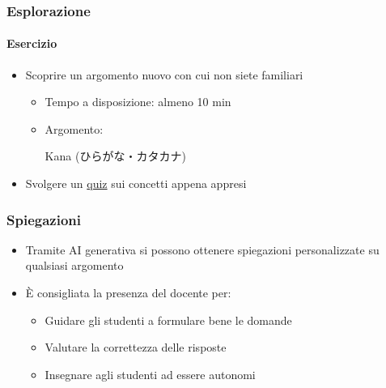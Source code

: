 \begin{exerciseframe}
    \frametitle{Esplorazione}
    \framesubtitle{Esercizio}

    \begin{itemize}
        \item Scoprire un argomento nuovo con cui non siete familiari
        \begin{itemize}
            \item Tempo a disposizione: almeno 10 min
            \item Argomento:\pause
                \begin{CJK}{UTF8}{min}
                    Kana (ひらがな・カタカナ)
                \end{CJK}
        \end{itemize}

        \pause
        \bigskip
        \item Svolgere un \href{https://play.blooket.com/host?id=67855de45130aefd0c2e869f}{quiz} sui concetti appena appresi
    \end{itemize}
\end{exerciseframe}

\begin{contentframe}
    \frametitle{Spiegazioni}

    \begin{itemize}
        \item Tramite AI generativa si possono ottenere spiegazioni personalizzate su qualsiasi argomento

        \bigskip
        \item È consigliata la presenza del docente per:
        \begin{itemize}
            \item Guidare gli studenti a formulare bene le domande
            \item Valutare la correttezza delle risposte
            \item Insegnare agli studenti ad essere autonomi
        \end{itemize}
    \end{itemize}
\end{contentframe}

